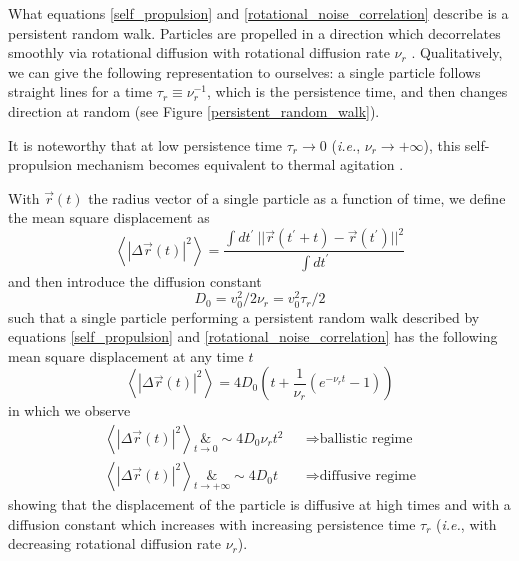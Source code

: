 \documentclass[class=report, float=false, crop=false]{standalone}
\begin{document}
What equations \ref{self_propulsion} and \ref{rotational_noise_correlation} describe is a persistent random walk. Particles are propelled in a direction which decorrelates smoothly via rotational diffusion with rotational diffusion rate $\nu_r$ \cite{cates2015motility}. Qualitatively, we can give the following representation to ourselves: a single particle follows straight lines for a time $\tau_r \equiv \nu_r^{-1}$, which is the persistence time, and then changes direction at random (see Figure \ref{persistent_random_walk}).\\


It is noteworthy that at low persistence time $\tau_r \rightarrow 0$ (\textit{i.e.}, $\nu_r \rightarrow +\infty$), this self-propulsion mechanism becomes equivalent to thermal agitation \cite{fily2014freezing}.


With $\vec{r}(t)$ the radius vector of a single particle as a function of time, we define the mean square displacement as
\begin{equation}
\left<|\Delta\vec{r}(t)|^2\right> = \frac{\int dt^{\prime}~ ||\vec{r}(t^{\prime} + t) - \vec{r}(t^{\prime})||^2}{\int dt^{\prime}}
\label{msd}
\end{equation}
and then introduce the diffusion constant
\begin{equation}
D_0 = v_0^2/2\nu_r = v_0^2\tau_r/2
\end{equation}
such that a single particle performing a persistent random walk described by equations \ref{self_propulsion} and \ref{rotational_noise_correlation} has the following mean square displacement at any time $t$ \cite{fily2012athermal}
\begin{equation}
\left<|\Delta\vec{r}(t)|^2\right> = 4D_0\left(t + \frac{1}{\nu_r}\left(e^{-\nu_rt}-1\right)\right)
\label{msd_prw}
\end{equation}
in which we observe
\begin{equation}
\begin{aligned}
\left<|\Delta\vec{r}(t)|^2\right> \underset{t \rightarrow 0}&{\sim} 4 D_0 \nu_r t^2 &&\Rightarrow \text{ballistic regime}\\
\left<|\Delta\vec{r}(t)|^2\right> \underset{t \rightarrow +\infty}&{\sim} 4 D_0 t &&\Rightarrow \text{diffusive regime}
\end{aligned}
\label{msd_prw_limit}
\end{equation}
showing that the displacement of the particle is diffusive at high times and with a diffusion constant which increases with increasing persistence time $\tau_r$ (\textit{i.e.}, with decreasing rotational diffusion rate $\nu_r$).\\
\end{document}
